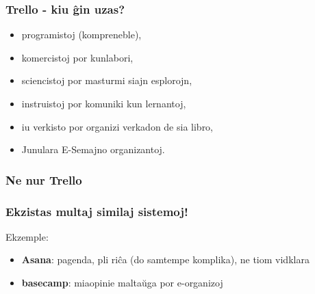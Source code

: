   \begin{frame}
    \frametitle{Trello - kiu ĝin uzas?}
    
    \begin{itemize}
    	\item programistoj (kompreneble),
    	\item komercistoj por kunlabori,
    	\item sciencistoj por masturmi siajn esplorojn,
    	\item instruistoj por komuniki kun lernantoj,
    	\item iu verkisto por organizi verkadon de sia libro,
    	\item Junulara E-Semajno organizantoj.
    \end{itemize}
    
  \end{frame}
  

  \begin{frame}
    \frametitle{Ne nur Trello}
    \frametitle{Ekzistas multaj similaj sistemoj!}
    Ekzemple:
    	\begin{itemize}
    		\item \textbf{Asana}: pagenda, pli riĉa (do samtempe komplika), ne tiom vidklara
    		\item \textbf{basecamp}: miaopinie maltaŭga por e-organizoj
    	\end{itemize}
  \end{frame}

